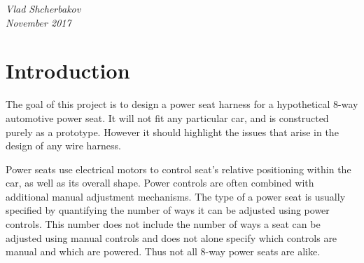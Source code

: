 \documentclass[12pt,letterpaper]{article}
\begin{document}
\begin{titlepage}
	\vfill %
	
	
	\parbox[t]{0.93\textwidth}{ %
		\raggedleft %
		\textit{
		  Vlad Shcherbakov \\
		  November 2017
		}
		
	}
	
\end{titlepage}
\section{Introduction}
The goal of this project is to design a power seat harness for a hypothetical 8-way automotive power seat. It will not fit any particular car, and is constructed purely as a prototype. However it should highlight the issues that arise in the design of any wire harness.

Power seats use electrical motors to control seat’s relative positioning within the car, as well as its overall shape. Power controls are often combined with additional manual adjustment mechanisms. The type of a power seat is usually specified by quantifying the number of ways it can be adjusted using power controls. This number does not include the number of ways a seat can be adjusted using manual controls and does not alone specify which controls are manual and which are powered. Thus not all 8-way power seats are alike.
\end{document}
